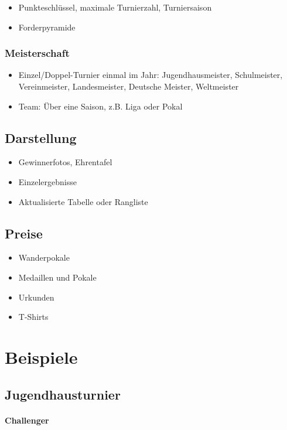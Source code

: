 \begin{itemize}
\item Punkteschlüssel, maximale Turnierzahl, Turniersaison
\item Forderpyramide
\end{itemize}

\subsubsection{Meisterschaft}
\label{turniere:ergebnisse:rahmen:meisterschaft}

\begin{itemize}
\item Einzel/Doppel-Turnier einmal im Jahr: Jugendhausmeister, Schulmeister, Vereinmeister, Landesmeister, Deutsche Meister, Weltmeister
\item Team: Über eine Saison, z.B. Liga oder Pokal
\end{itemize}


\subsection{Darstellung}
\label{turniere:ergebnisse:formate}

\begin{itemize}
\item Gewinnerfotos, Ehrentafel
\item Einzelergebnisse
\item Aktualisierte Tabelle oder Rangliste  
\end{itemize}

\subsection{Preise}
\label{turniere:ergebnisse:preise}

\begin{itemize}
\item Wanderpokale
\item Medaillen und Pokale
\item Urkunden
\item T-Shirts
\end{itemize}

\section{Beispiele}
\label{turniere:beispiele}


\subsection{Jugendhausturnier}
\label{turniere:beispiele:jugend}




\paragraph{Challenger}
\label{turniere:beispiele:challenger}
